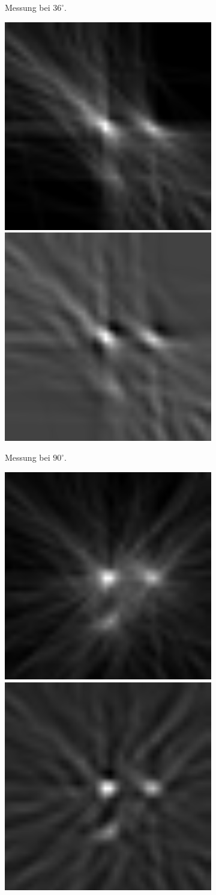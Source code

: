 \documentclass[slug=PET, room=Andreas-Schubert-Bau\,\ 424A, supervisor=Carsten\ Bittrich, coursedate=10.\ 01.\ 2020]{../../Lab_Report_LaTeX/lab_report}
\begin{document}
\begin{figure}
\begin{subfigure}{0.5\textwidth}
		\caption{Messung bei \(36^\circ\).}
	\end{subfigure}
	\begin{subfigure}{0.5\textwidth}
		\centering
		\includegraphics[width=.4\textwidth]{../messungen/oliTOM1/9_einfach.png}
		\includegraphics[width=.4\textwidth]{../messungen/oliTOM1/9_gefiltert.png}
		\caption{Messung bei \(90^\circ\).}
	\end{subfigure}
	\begin{subfigure}{0.5\textwidth}
		\centering
		\includegraphics[width=.4\textwidth]{../messungen/oliTOM1/13_einfach.png}
		\includegraphics[width=.4\textwidth]{../messungen/oliTOM1/13_gefiltert.png}

\end{subfigure}
\end{figure}
\end{document}

